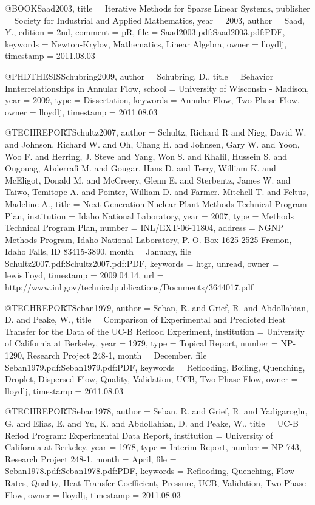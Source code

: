 {{@BOOK{Saad2003,
  title = {Iterative Methods for Sparse Linear Systems},
  publisher = {Society for Industrial and Applied Mathematics},
  year = {2003},
  author = {Saad, Y.},
  edition = {2nd},
  comment = {pR},
  file = {Saad2003.pdf:Saad2003.pdf:PDF},
  keywords = {Newton-Krylov, Mathematics, Linear Algebra},
  owner = {lloydlj},
  timestamp = {2011.08.03}
}

@PHDTHESIS{Schubring2009,
  author = {Schubring, D.},
  title = {Behavior Innterrelationships in Annular Flow},
  school = {University of Wisconsin - Madison},
  year = {2009},
  type = {Dissertation},
  keywords = {Annular Flow, Two-Phase Flow},
  owner = {lloydlj},
  timestamp = {2011.08.03}
}

@TECHREPORT{Schultz2007,
  author = {Schultz, Richard R and Nigg, David W. and Johnson, Richard W. and
	Oh, Chang H. and Johnsen, Gary W. and Yoon, Woo F. and Herring, J.
	Steve and Yang, Won S. and Khalil, Hussein S. and Ougouag, Abderrafi
	M. and Gougar, Hans D. and Terry, William K. and McEligot, Donald
	M. and McCreery, Glenn E. and Sterbentz, James W. and Taiwo, Temitope
	A. and Pointer, William D. and Farmer. Mitchell T. and Feltus, Madeline
	A.},
  title = {Next Generation Nuclear Plant Methods Technical Program Plan},
  institution = {Idaho National Laboratory},
  year = {2007},
  type = {Methods Technical Program Plan},
  number = {INL/EXT-06-11804},
  address = {NGNP Methods Program, Idaho National Laboratory, P. O. Box 1625 2525
	Fremon, Idaho Falls, ID 83415-3890},
  month = {January},
  file = {Schultz2007.pdf:Schultz2007.pdf:PDF},
  keywords = {htgr, unread},
  owner = {lewis.lloyd},
  timestamp = {2009.04.14},
  url = {http://www.inl.gov/technicalpublications/Documents/3644017.pdf}
}

@TECHREPORT{Seban1979,
  author = {Seban, R. and Grief, R. and Abdollahian, D. and Peake, W.},
  title = {Comparison of Experimental and Predicted Heat Transfer for the Data
	of the UC-B Reflood Experiment},
  institution = {University of California at Berkeley},
  year = {1979},
  type = {Topical Report},
  number = {NP-1290, Research Project 248-1},
  month = {December},
  file = {Seban1979.pdf:Seban1979.pdf:PDF},
  keywords = {Reflooding, Boiling, Quenching, Droplet, Dispersed Flow, Quality,
	Validation, UCB, Two-Phase Flow},
  owner = {lloydlj},
  timestamp = {2011.08.03}
}

@TECHREPORT{Seban1978,
  author = {Seban, R. and Grief, R. and Yadigaroglu, G. and Elias, E. and Yu,
	K. and Abdollahian, D. and Peake, W.},
  title = {UC-B Reflod Program: Experimental Data Report},
  institution = {University of California at Berkeley},
  year = {1978},
  type = {Interim Report},
  number = {NP-743, Research Project 248-1},
  month = {April},
  file = {Seban1978.pdf:Seban1978.pdf:PDF},
  keywords = {Reflooding, Quenching, Flow Rates, Quality, Heat Transfer Coefficient,
	Pressure, UCB, Validation, Two-Phase Flow},
  owner = {lloydlj},
  timestamp = {2011.08.03}
}

}}
